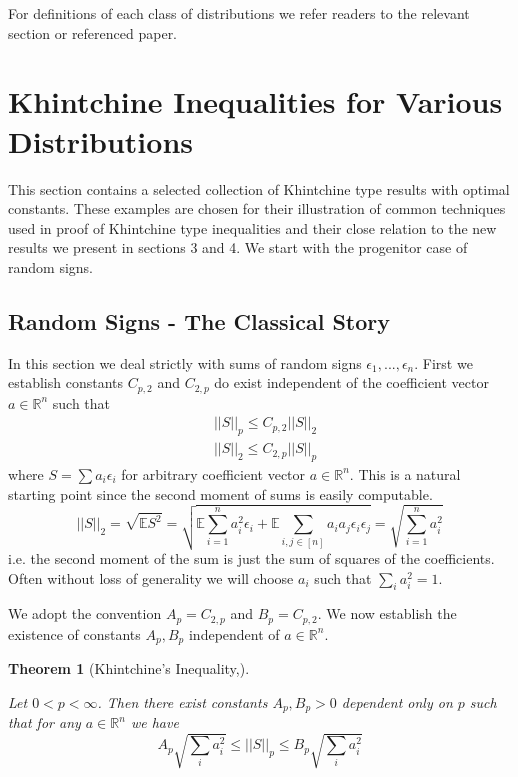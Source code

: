 \documentclass[10pt]{article}
\newcommand{\E}{\mathbb{E}}
\newcommand{\1}{\textbf{1}}
\newcommand{\R}{\mathbb{R}}
\newcommand{\norm}[1]{\left\lvert\left\lvert#1\right\rvert\right\rvert}
\newtheorem{theorem}{Theorem}[subsection]
\theoremstyle{remark}
\theoremstyle{definition}
\begin{document}
For definitions of each class of distributions we refer readers to the relevant section or referenced paper. 

\newpage

\section{Khintchine Inequalities for Various Distributions}

This section contains a selected collection of Khintchine type results with optimal constants. These examples are chosen for their illustration of common techniques used in proof of Khintchine type inequalities and their close relation to the new results we present in sections 3 and 4. We start with the progenitor case of random signs.

\subsection{Random Signs - The Classical Story}

In this section we deal strictly with sums of random signs $\epsilon_1,...,\epsilon_n$. First we establish constants $C_{p,2}$ and $C_{2,p}$ do exist independent of the coefficient vector $a \in \R^n$ such that 
\begin{align*}
	&\norm{S}_p \leq C_{p,2} \norm{S}_2 \\
	&\norm{S}_2 \leq C_{2,p}\norm{S}_p
\end{align*} where $S = \sum a_i \epsilon_i$ for arbitrary coefficient vector $a \in \R^n$. This is a natural starting point since the second moment of sums is easily computable.
\begin{equation*}
	\norm{S}_2 = \sqrt{\E S^2} = \sqrt{\E\sum_{i=1}^n a_i^2 \epsilon_i + \E\sum_{i,j \in [n]}a_ia_j \epsilon_i\epsilon_j} = \sqrt{\sum_{i=1}^n a_i^2}
\end{equation*} i.e. the second moment of the sum is just the sum of squares of the coefficients. Often without loss of generality we will choose $a_i$ such that $\sum_i a_i^2 = 1$.  

We adopt the convention $A_p = C_{2,p}$ and $B_p = C_{p,2}$. We now establish the existence of constants $A_p,B_p$ independent of $a \in \R^n$.

\begin{theorem}[Khintchine's Inequality,\cite{LT}]\label{thm:RS1}

	Let $0 < p < \infty$. Then there exist constants $A_p,B_p > 0$ dependent only on $p$ such that for any $a \in \R^n$ we have 
	\begin{equation}\label{eq:RS1}
		A_p\sqrt{\sum_i a_i^2} \leq \norm{S}_p \leq B_p \sqrt{\sum_i a_i^2}
	\end{equation}
\end{theorem}
\end{document}
